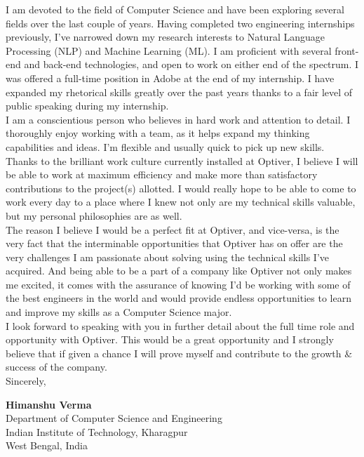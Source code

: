 \documentclass[a4paper,10pt]{extarticle} %
\begin{document}
I am devoted to the ﬁeld of Computer Science and have been exploring several ﬁelds over the last couple of years. Having completed two engineering internships previously, I've narrowed down my research interests to Natural Language Processing (NLP) and Machine Learning (ML). I am proficient with several front-end and back-end technologies, and open to work on either end of the spectrum. I was offered a full-time position in Adobe at the end of my internship. I have expanded my rhetorical skills greatly over the past years thanks to a fair level of public speaking during my internship. \\

I am a conscientious person who believes in hard work and attention to detail. I thoroughly enjoy working with a team, as it helps expand my thinking capabilities and ideas. I’m ﬂexible and usually quick to pick up new skills. Thanks to the brilliant work culture currently installed at Optiver, I believe I will be able to work at maximum efficiency and make more than satisfactory contributions to the project(s) allotted. I would really hope to be able to come to work every day to a place where I knew not only are my technical skills valuable, but my personal philosophies are as well.\\

The reason I believe I would be a perfect fit at Optiver, and vice-versa, is the very fact that the interminable opportunities that Optiver has on offer are the very challenges I am passionate about solving using the technical skills I've acquired. And being able to be a part of a company like Optiver not only makes me excited, it comes with the assurance of knowing I'd be working with some of the best engineers in the world and would provide endless opportunities to learn and improve my skills as a Computer Science major.\\

I look forward to speaking with you in further detail about the full time role and opportunity with Optiver. This would be a great opportunity and I strongly believe that if given a chance I will prove myself and contribute to the growth \& success of the company.\\

Sincerely,

\textbf{\large{Himanshu Verma}}\\
Department of Computer Science and Engineering\\
Indian Institute of Technology, Kharagpur\\
West Bengal, India\\

\end{document}
